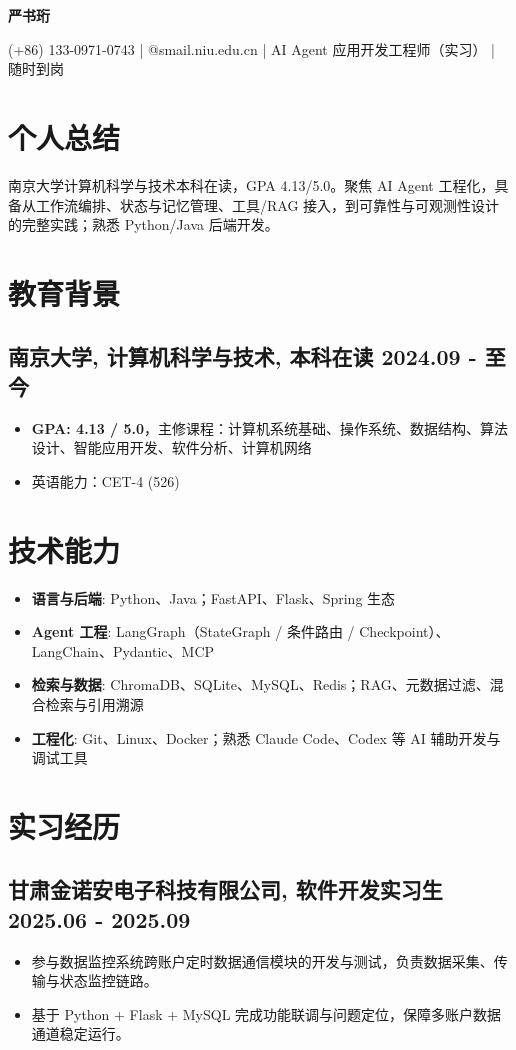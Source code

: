 \documentclass[10pt,a4paper]{article}
\newcommand{\name}[1]{%
  \centerline{\LARGE\bfseries{#1}}
  \vspace{0.8ex}
}
\newcommand{\contactInfo}[4]{%
  \centerline{\normalsize #1 \quad | \quad #2 \quad | \quad #3 \quad | \quad #4}
  \vspace{0.8ex}
}
\newcommand{\datedsubsection}[2]{%
  \subsection[#1]{#1 \hfill #2}%
}
\begin{document}

\name{严书珩}

\contactInfo{(+86) 133-0971-0743}{241220152@smail.niu.edu.cn}{AI Agent 应用开发工程师（实习）}{随时到岗}

\section{个人总结}
南京大学计算机科学与技术本科在读，GPA 4.13/5.0。聚焦 AI Agent 工程化，具备从工作流编排、状态与记忆管理、工具/RAG 接入，到可靠性与可观测性设计的完整实践；熟悉 Python/Java 后端开发。

\section{教育背景}
\datedsubsection{\textbf{南京大学}, 计算机科学与技术, 本科在读}{2024.09 - 至今}
\begin{itemize}
  \item \textbf{GPA: 4.13 / 5.0}，主修课程：计算机系统基础、操作系统、数据结构、算法设计、智能应用开发、软件分析、计算机网络
  \item 英语能力：CET-4 (526)
\end{itemize}

\section{技术能力}
\begin{itemize}
  \item \textbf{语言与后端}: Python、Java；FastAPI、Flask、Spring 生态
  \item \textbf{Agent 工程}: LangGraph（StateGraph / 条件路由 / Checkpoint）、LangChain、Pydantic、MCP
  \item \textbf{检索与数据}: ChromaDB、SQLite、MySQL、Redis；RAG、元数据过滤、混合检索与引用溯源
  \item \textbf{工程化}: Git、Linux、Docker；熟悉 Claude Code、Codex 等 AI 辅助开发与调试工具
\end{itemize}

\section{实习经历}
\datedsubsection{\textbf{甘肃金诺安电子科技有限公司}, 软件开发实习生}{2025.06 - 2025.09}
\begin{itemize}
  \item 参与数据监控系统跨账户定时数据通信模块的开发与测试，负责数据采集、传输与状态监控链路。
  \item 基于 Python + Flask + MySQL 完成功能联调与问题定位，保障多账户数据通道稳定运行。
\end{itemize}
\end{document}
